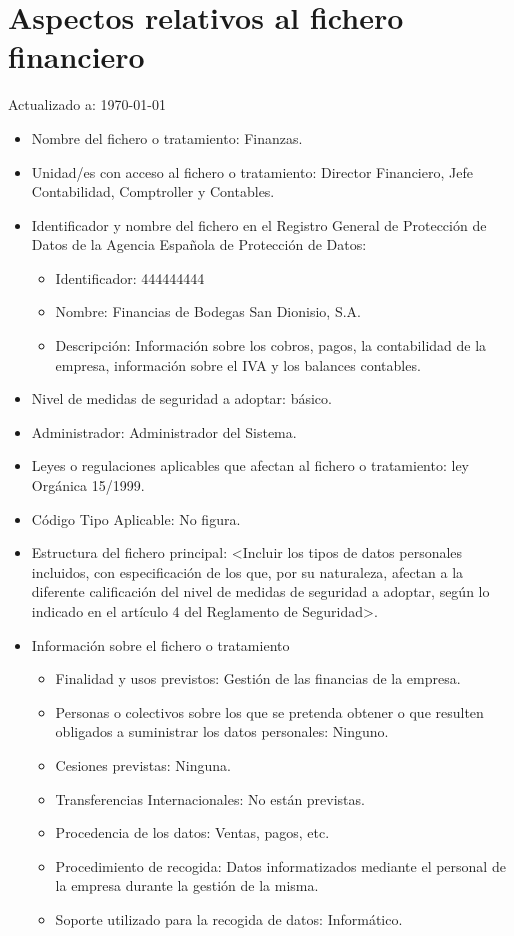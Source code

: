 \documentclass[a4paper,11pt,bibtotoc,noliststotoc]{scrbook}
\newcommand{\laorganizacion}{Bodegas San Dionisio, S.A.}
\begin{document}
\section{Aspectos relativos al fichero financiero}


Actualizado a: \today

\begin{itemize}
\item Nombre del fichero o tratamiento: Finanzas.

\item Unidad/es con acceso al fichero o tratamiento: Director Financiero, Jefe Contabilidad, Comptroller y Contables.

\item Identificador y nombre del fichero en el Registro General de Protección de Datos de la Agencia Española de Protección de Datos: 
	\begin{itemize}
	\item Identificador: 444444444
	\item Nombre: Financias de \laorganizacion
	\item Descripción: Información sobre los cobros, pagos, la contabilidad de la empresa, información sobre el IVA y los balances contables.
	\end{itemize}

\item Nivel de medidas de seguridad a adoptar: básico.

\item Administrador: Administrador del Sistema.

\item Leyes o regulaciones aplicables que afectan al fichero o tratamiento: ley Orgánica 15/1999.

\item Código Tipo Aplicable: No figura.

\item Estructura del fichero principal: <Incluir los tipos de datos personales incluidos, con especificación de los que, por su naturaleza, afectan a la diferente calificación del nivel de medidas de seguridad a adoptar, según lo indicado en el artículo 4 del Reglamento de Seguridad>.

\item Información sobre el fichero o tratamiento
	\begin{itemize}
	\item Finalidad y usos previstos: Gestión de las financias de la empresa.
	\item Personas o colectivos sobre los que se pretenda obtener o que resulten obligados a suministrar los datos personales: Ninguno.
	\item Cesiones previstas: Ninguna.
	\item Transferencias Internacionales: No están previstas.
	\item Procedencia de los datos: Ventas, pagos, etc.
	\item Procedimiento de recogida: Datos informatizados mediante el personal de la empresa durante la gestión de la misma.
	\item Soporte utilizado para la recogida de datos: Informático.
	\end{itemize}


\end{itemize}
\end{document}
